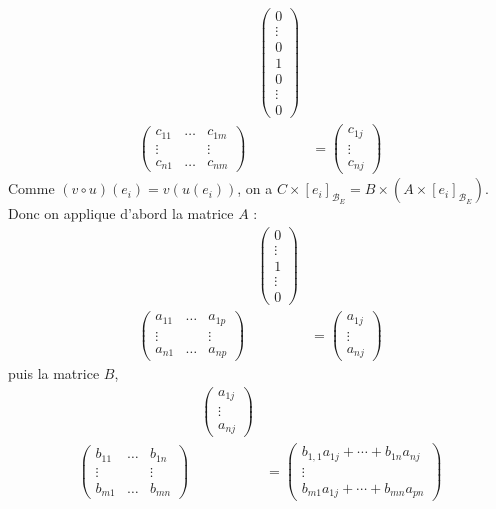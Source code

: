 \documentclass{book}
\begin{document}
$$\begin{aligned}
&\begin{pmatrix}0\\\vdots\\0\\1\\0\\\vdots\\0\end{pmatrix}  \\
\begin{pmatrix}
    c_{11} &  \dots & c_{1m}  \\
    \vdots &   &  \vdots  \\
    c_{n1} &  \dots & c_{nm}
  \end{pmatrix}& &=\begin{pmatrix}c_{1j}\\\vdots\\c_{nj}\end{pmatrix}
\end{aligned}$$
Comme $ (v\circ u)(e_i)=v(u(e_i))$, on a $C\times[e_i]_{\mathcal{B}_E} = B\times(A\times [e_i]_{\mathcal{B}_E})$. Donc on applique d'abord la matrice $A$ :
$$\begin{aligned}
&\begin{pmatrix}0\\\vdots\\1\\\vdots\\0\end{pmatrix}&\\   
\begin{pmatrix}
    a_{11} &  \dots & a_{1p}  \\
    \vdots &   &  \vdots  \\
    a_{n1} &  \dots & a_{np}
  \end{pmatrix}& &=\begin{pmatrix}a_{1j}\\\vdots\\a_{nj}\end{pmatrix}
\end{aligned}$$
puis la matrice $B$,
$$\begin{aligned}
&\begin{pmatrix}a_{1j}\\\vdots\\a_{nj}\end{pmatrix}&\\   
\begin{pmatrix}
    b_{11} &  \dots & b_{1n}  \\
    \vdots &   &  \vdots  \\
    b_{m1} &  \dots & b_{mn}
  \end{pmatrix}& &=\begin{pmatrix}b_{1,1}a_{1j}+\cdots +b_{1n}a_{nj}\\\vdots\\b_{m1}a_{1j}+\cdots +b_{mn}a_{pn}\end{pmatrix}
\end{aligned}$$
\end{document}
